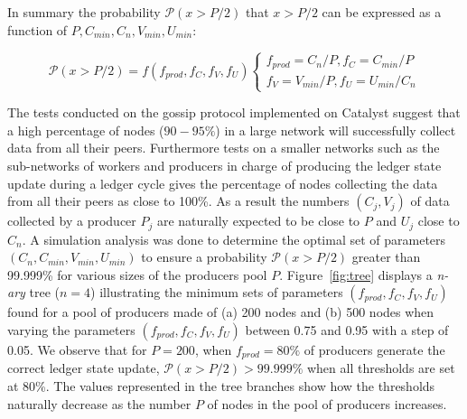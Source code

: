 In summary the probability $\mathcal{P}(x>P/2)$ that $x >P/2$ can be expressed as a function of $P, C_{min} ,C_n, V_{min}, U_{min}$:
\begin{center}
\[
  \mathcal{P}(x>P/2) = f(f_{prod}, f_C, f_V, f_U)\begin{cases}
               f_{prod} = C_n/P, f_C = C_{min}/P\\
               f_V = V_{min}/P, f_{U} = U_{min}/C_n
            \end{cases}
\]
\end{center}
The tests conducted on the gossip protocol implemented on Catalyst suggest that a high percentage of nodes ($90-95\%$) in a large network will successfully collect data from all their peers. Furthermore tests on a smaller networks such as the sub-networks of workers and producers in charge of producing the ledger state update during a ledger cycle gives the percentage of nodes collecting the data from all their peers as close to 100\%. As a result the numbers $(C_{j} ,V_{j})$ of data collected by a producer $P_j$ are naturally expected to be close to $P$ and $U_j$ close to $C_n$. A simulation analysis was done to determine the optimal set of parameters $(C_n, C_{min}, V_{min}, U_{min})$ to ensure a probability $\mathcal{P}(x>P/2)$ greater than 99.999\% for various sizes of the producers pool $P$.
Figure~\ref{fig:tree} displays a \textit{n-ary} tree ($n=4$) illustrating the minimum sets of parameters $(f_{prod}, f_C, f_V, f_U)$ found for a pool of producers made of (a) 200 nodes and (b) 500 nodes when varying the parameters $(f_{prod}, f_C, f_V, f_U)$ between 0.75 and 0.95 with a step of 0.05. We observe that for $P = 200$, when $f_{prod}=80\%$ of producers generate the correct ledger state update, $\mathcal{P}(x>P/2) > 99.999\%$ when all thresholds are set at 80\%. The values represented in the tree branches show how the thresholds naturally decrease as the number $P$ of nodes in the pool of producers increases.



